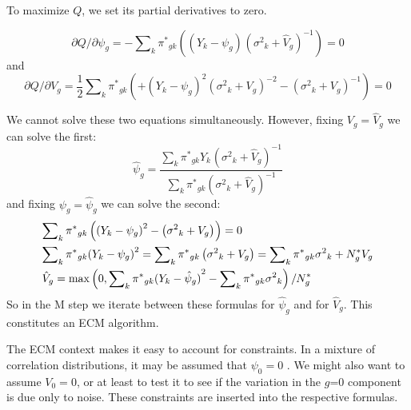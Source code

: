\documentclass[12pt]{article}
\begin{document}
To maximize $Q$, we set its partial derivatives to zero.

\begin{equation*}
\partial Q/\partial {\psi _g} =  - \sum\nolimits_k {{\pi ^*}_{gk}\left( {{{({Y_k} - {\psi _g})}^{}}{{\left( {{\sigma ^2}_k + {{\hat V}_g}} \right)}^{ - 1}}} \right)}  = 0
\end{equation*}
and
\begin{equation*}
\partial Q/\partial {V_g} = \frac{1}{2}\sum\nolimits_k {{\pi ^*}_{gk}\left( { + {{({Y_k} - {\psi _g})}^2}{{\left( {{\sigma ^2}_k + {V_g}} \right)}^{ - 2}} - {{\left( {{\sigma ^2}_k + {V_g}} \right)}^{ - 1}}} \right)}  = 0
\end{equation*}

We cannot solve these two equations simultaneously. However, fixing ${V_g} = {\hat V_g}$ we can solve the first:
\begin{equation*}
{\hat \psi _g} = \frac{{\sum\nolimits_k {{\pi ^*}_{gk}{Y_k}^{}{{\left( {{\sigma ^2}_k + {{\hat V}_g}} \right)}^{ - 1}}} }}{{\sum\nolimits_k {{\pi ^*}_{gk}{{\left( {{\sigma ^2}_k + {{\hat V}_g}} \right)}^{ - 1}}} }}
\end{equation*}
and fixing ${\psi _g} = {\hat \psi _g}$ we can solve the second:
\begin{equation*}
\begin{gathered}
  \sum\nolimits_k {{\pi ^*}_{gk}\left( {{{({Y_k} - {\psi _g})}^2} - {{\left( {{\sigma ^2}_k + {V_g}} \right)}^{}}} \right)}  = 0 \hfill \\
  \sum\nolimits_k {{\pi ^*}_{gk}{{({Y_k} - {\psi _g})}^2}}  = \sum\nolimits_k {{\pi ^*}_{gk}\left( {{\sigma ^2}_k + {V_g}} \right)}  = \sum\nolimits_k {{\pi ^*}_{gk}{\sigma ^2}_k + N_g^*{V_g}}  \hfill \\
  {{\hat V}_g} = \max \left( {0,\sum\nolimits_k {{\pi ^*}_{gk}{{({Y_k} - {{\hat \psi }_g})}^2}}  - \sum\nolimits_k {{\pi ^*}_{gk}{\sigma ^2}_k} } \right)/N_g^* \hfill \\ 
\end{gathered} 
\end{equation*}
So in the M step we iterate between these formulas for  ${\hat \psi _g}$ and for ${\hat V_g}$. This constitutes an ECM algorithm.

The ECM context makes it easy to account for constraints.  In a mixture of correlation distributions, it may be assumed that $\psi _{0}=0$ . We might also want to assume  $V_{0}=0$, or at least to test it to see if the variation in the $g$=0 component is due only to noise. These constraints are inserted into the respective formulas.
\end{document}
